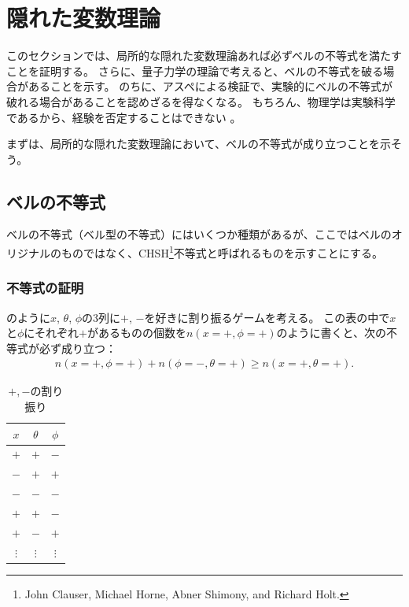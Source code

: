 \documentclass[10pt,b5paper,papersize,dvipdfmx]{jsbook}
\begin{document}
\fi
\ifsecII
\section{隠れた変数理論}\label{sec:2}

このセクションでは、局所的な隠れた変数理論あれば必ずベルの不等式を満たすことを証明する。
さらに、量子力学の理論で考えると、ベルの不等式を破る場合があることを示す。
のちに、アスペによる検証で、実験的にベルの不等式が破れる場合があることを認めざるを得なくなる。
もちろん、物理学は実験科学であるから、経験を否定することはできない
。\par
まずは、局所的な隠れた変数理論において、ベルの不等式が成り立つことを示そう。

%
\subsection{ベルの不等式} %

ベルの不等式（ベル型の不等式）にはいくつか種類があるが、ここではベルのオリジナルのものではなく、CHSH\footnote{
  John Clauser, Michael Horne, Abner Shimony, and Richard Holt. %
}不等式と呼ばれるものを示すことにする。


%
\subsubsection{不等式の証明}
のように$x$, $\theta$, $\phi$の3列に$+$, $-$を好きに割り振るゲームを考える。
この表の中で$x$と$\phi$にそれぞれ$+$があるものの個数を$n(x=+,\phi=+)$のように書くと、次の不等式が必ず成り立つ：
\begin{align}
  n(x=+,\phi=+) + n(\phi=-,\theta=+) \ge n(x=+,\theta=+).
  \label{eq:bell's ineq}
\end{align}

\begin{table}[htbp]
  \centering
  \caption{$+, -$の割り振り}
  \label{tab:pm}
  \begin{tabular}{ccc} \hline
    $x$ & $\theta$ & $\phi$ \\ \hline
    $+$ & $+$ & $-$ \\
    $-$ & $+$ & $+$ \\
    $-$ & $-$ & $-$ \\
    $+$ & $+$ & $-$ \\
    $+$ & $-$ & $+$ \\
    $\vdots$ & $\vdots$ & $\vdots$ \\ \hline
  \end{tabular}
\end{table}
\end{document}
